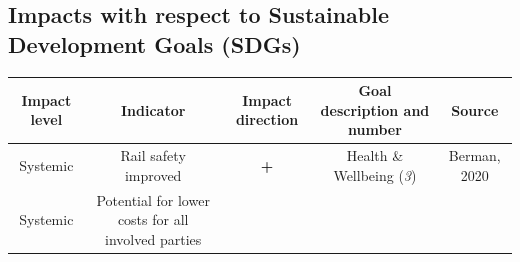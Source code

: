 \documentclass[
]{book}
\begin{document}
\hypertarget{impacts-with-respect-to-sustainable-development-goals-sdgs-26}{%
\subsection*{Impacts with respect to Sustainable Development Goals (SDGs)}\label{impacts-with-respect-to-sustainable-development-goals-sdgs-26}}

\begin{longtable}[]{@{}ccccc@{}}
\toprule
\begin{minipage}[b]{0.17\columnwidth}\centering
Impact level\strut
\end{minipage} & \begin{minipage}[b]{0.16\columnwidth}\centering
Indicator\strut
\end{minipage} & \begin{minipage}[b]{0.17\columnwidth}\centering
Impact direction\strut
\end{minipage} & \begin{minipage}[b]{0.17\columnwidth}\centering
Goal description and number\strut
\end{minipage} & \begin{minipage}[b]{0.17\columnwidth}\centering
Source\strut
\end{minipage}\tabularnewline
\midrule
\endhead
\begin{minipage}[t]{0.17\columnwidth}\centering
Systemic\strut
\end{minipage} & \begin{minipage}[t]{0.16\columnwidth}\centering
Rail safety improved\strut
\end{minipage} & \begin{minipage}[t]{0.17\columnwidth}\centering
\textbf{+}\strut
\end{minipage} & \begin{minipage}[t]{0.17\columnwidth}\centering
Health \& Wellbeing (\emph{3})\strut
\end{minipage} & \begin{minipage}[t]{0.17\columnwidth}\centering
Berman, 2020\strut
\end{minipage}\tabularnewline
\begin{minipage}[t]{0.17\columnwidth}\centering
Systemic\strut
\end{minipage} & \begin{minipage}[t]{0.16\columnwidth}\centering
Potential for lower costs for all involved parties\strut

\end{minipage}
\end{longtable}
\end{document}
